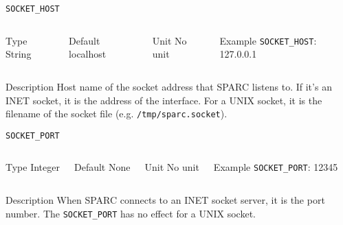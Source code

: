 \begin{frame}[allowframebreaks]{\texttt{SOCKET\_HOST}} \label{SOCKET_HOST}
\vspace*{-12pt}
\begin{columns}
\begin{block}{Type}
String
\end{block}

\begin{block}{Default}
localhost
\end{block}

\begin{block}{Unit}
No unit
\end{block}

\begin{block}{Example}
\texttt{SOCKET\_HOST}: 127.0.0.1
\end{block}
\end{columns}

\begin{block}{Description}
  Host name of the socket address that SPARC listens to.  If it's an
  INET socket, it is the address of the interface.  For a UNIX socket,
  it is the filename of the socket file
  (e.g. \texttt{/tmp/sparc.socket}).
\end{block}

\end{frame}

\begin{frame}[allowframebreaks]{\texttt{SOCKET\_PORT}} \label{SOCKET_PORT}
\vspace*{-12pt}
\begin{columns}
\begin{block}{Type}
Integer
\end{block}

\begin{block}{Default}
None
\end{block}

\begin{block}{Unit}
No unit
\end{block}

\begin{block}{Example}
\texttt{SOCKET\_PORT}: 12345
\end{block}
\end{columns}

\begin{block}{Description}
  When SPARC connects to an INET socket server, it is the port number. The \texttt{SOCKET\_PORT} has no effect for a UNIX socket.
\end{block}

\end{frame}

